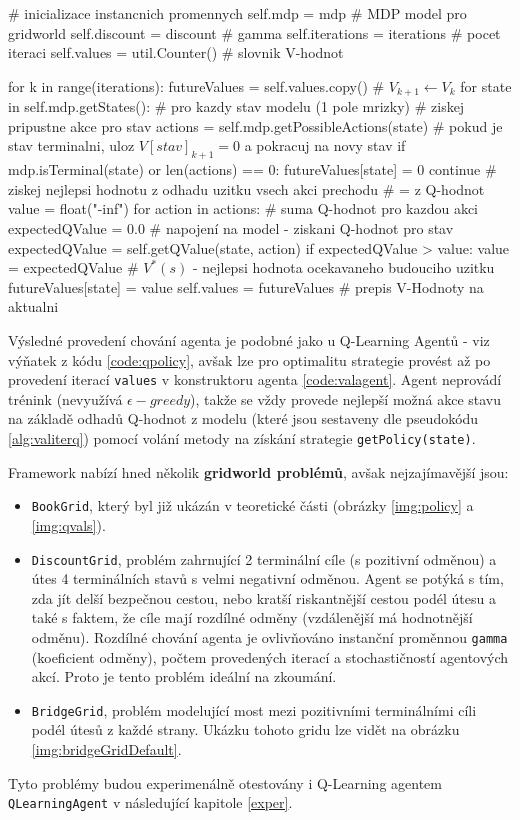 \begin{python}[label={code:valagent}]
# inicializace instancnich promennych
self.mdp = mdp			# MDP model pro gridworld
self.discount = discount     # gamma
self.iterations = iterations # pocet iteraci
self.values = util.Counter() # slovnik V-hodnot

for k in range(iterations):
   futureValues = self.values.copy()   # $V_{k+1} \leftarrow V_k$
   for state in self.mdp.getStates():  # pro kazdy stav modelu (1 pole mrizky)
      # ziskej pripustne akce pro stav
      actions = self.mdp.getPossibleActions(state)
      # pokud je stav terminalni, uloz $V[stav]_{k+1} = 0$ a pokracuj na novy stav
      if mdp.isTerminal(state) or len(actions) == 0:
         futureValues[state] = 0
         continue
      # ziskej nejlepsi hodnotu z odhadu uzitku vsech akci prechodu
      # = z Q-hodnot
      value = float("-inf")
      for action in actions:
         # suma Q-hodnot pro kazdou akci
         expectedQValue = 0.0
         # napojení na model - ziskani Q-hodnot pro stav
         expectedQValue = self.getQValue(state, action)
         if expectedQValue > value:
            value = expectedQValue
      # $V^*(s)$ - nejlepsi hodnota ocekavaneho budouciho uzitku
      futureValues[state] = value
   self.values = futureValues # prepis V-Hodnoty na aktualni
\end{python}

Výsledné provedení chování agenta je podobné jako u Q-Learning Agentů - viz výňatek z kódu \ref{code:qpolicy}, avšak lze pro optimalitu strategie provést až po provedení iterací \texttt{values} v konstruktoru agenta \ref{code:valagent}. Agent neprovádí trénink (nevyužívá $\epsilon-greedy$), takže se vždy provede nejlepší možná akce stavu na základě odhadů Q-hodnot z modelu (které jsou sestaveny dle pseudokódu \ref{alg:valiterq}) pomocí volání metody na získání strategie \texttt{getPolicy(state)}.

Framework nabízí hned několik \textbf{gridworld problémů}, avšak nejzajímavější jsou:
\begin{itemize}
  \item \texttt{BookGrid}, který byl již ukázán v teoretické části (obrázky \ref{img:policy} a \ref{img:qvals}).
  \item \texttt{DiscountGrid}, problém zahrnující 2 terminální cíle (s pozitivní odměnou) a útes 4 terminálních stavů s velmi negativní odměnou. Agent se potýká s tím, zda jít delší bezpečnou cestou, nebo kratší riskantnější cestou podél útesu a také s faktem, že cíle mají rozdílné odměny (vzdálenější má hodnotnější odměnu). Rozdílné chování agenta je ovlivňováno instanční proměnnou \texttt{gamma} (koeficient odměny), počtem provedených iterací a stochastičností agentových akcí. Proto je tento problém ideální na zkoumání.
  \item \texttt{BridgeGrid}, problém modelující most mezi pozitivními terminálními cíli podél útesů z každé strany. Ukázku tohoto gridu lze vidět na obrázku \ref{img:bridgeGridDefault}.
\end{itemize}
Tyto problémy budou experimenálně otestovány i Q-Learning agentem \texttt{QLearningAgent} v následující kapitole \ref{exper}.

